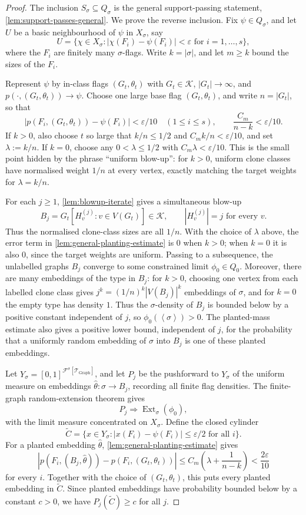 \documentclass[11pt]{article}
\theoremstyle{definition}
\newcommand{\F}{\mathcal{F}}
\newcommand{\K}{\mathcal{K}}
\newcommand{\T}{\mathcal{T}}
\newcommand{\Ext}{\operatorname{Ext}}
\newcommand{\brak}[1]{\left\langle #1\right\rangle}
\newcommand{\eps}{\varepsilon}
\begin{document}
\begin{proof}
The inclusion $S_\sigma\subseteq Q_\sigma$ is the general support-passing statement,
\cref{lem:support-passes-general}.  We prove the reverse inclusion.  Fix
$\psi\in Q_\sigma$, and let $U$ be a basic neighbourhood of $\psi$ in $X_\sigma$, say
\[
  U=\{\chi\in X_\sigma:
      |\chi(F_i)-\psi(F_i)|<\eps\text{ for }i=1,\ldots,s\},
\]
where the $F_i$ are finitely many $\sigma$-flags.  Write $k=|\sigma|$, and let
$m\ge k$ bound the sizes of the $F_i$.

Represent $\psi$ by in-class flags $(G_t,\theta_t)$ with $G_t\in\K$,
$|G_t|\to\infty$, and $p(\cdot,(G_t,\theta_t))\to\psi$.  Choose one large base flag
$(G_t,\theta_t)$, and write $n=|G_t|$, so that
\[
  |p(F_i,(G_t,\theta_t))-\psi(F_i)|<\eps/10
  \quad(1\le i\le s),
  \qquad
  \frac{C_m}{n-k}<\eps/10.
\]
If $k>0$, also choose $t$ so large that $k/n\le1/2$ and $C_m k/n<\eps/10$, and set
$\lambda:=k/n$.  If $k=0$, choose any $0<\lambda\le1/2$ with
$C_m\lambda<\eps/10$.  This is the small point hidden by the phrase ``uniform blow-up'':
for $k>0$, uniform clone classes have normalised weight $1/n$ at every vertex, exactly
matching the target weights for $\lambda=k/n$.

For each $j\ge1$, \cref{lem:blowup-iterate} gives a simultaneous blow-up
\[
  B_j=G_t[H_v^{(j)}:v\in V(G_t)]\in\K,
  \qquad |H_v^{(j)}|=j\text{ for every }v.
\]
Thus the normalised clone-class sizes are all $1/n$.  With the choice of $\lambda$ above,
the error term in \cref{lem:general-planting-estimate} is $0$ when $k>0$; when $k=0$ it is
also $0$, since the target weights are uniform.  Passing to a subsequence, the unlabelled
graphs $B_j$ converge to some constrained limit $\phi_0\in Q_0$.  Moreover, there are
many embeddings of the type in $B_j$: for $k>0$, choosing one vertex from each labelled
clone class gives $j^k=(1/n)^k|V(B_j)|^k$ embeddings of $\sigma$, and for $k=0$ the
empty type has density $1$.  Thus the $\sigma$-density of $B_j$ is
bounded below by a positive constant independent of $j$, so
$\phi_0(\brak\sigma)>0$.  The planted-mass estimate also gives a positive lower bound,
independent of $j$, for the probability that a uniformly random embedding of
$\sigma$ into $B_j$ is one of these planted embeddings.

Let $Y_\sigma=[0,1]^{\F^\sigma[\T_{\mathrm{Graph}}]}$, and let $P_j$ be the pushforward
to $Y_\sigma$ of the uniform measure on embeddings
$\widehat\theta:\sigma\to B_j$, recording all finite flag densities.  The finite-graph
random-extension theorem gives
\[
  P_j\Rightarrow \Ext_\sigma(\phi_0),
\]
with the limit measure concentrated on $X_\sigma$.  Define the closed cylinder
\[
  \widetilde C=
  \{x\in Y_\sigma:
    |x(F_i)-\psi(F_i)|\le\eps/2\text{ for all }i\}.
\]
For a planted embedding $\widehat\theta$, \cref{lem:general-planting-estimate} gives
\[
  |p(F_i,(B_j,\widehat\theta))-p(F_i,(G_t,\theta_t))|
  \le C_m\left(\lambda+\frac1{n-k}\right)<\frac{2\eps}{10}
\]
for every $i$.  Together with the choice of $(G_t,\theta_t)$, this puts every planted
embedding in $\widetilde C$.  Since planted embeddings have probability bounded below by a
constant $c>0$, we have $P_j(\widetilde C)\ge c$ for all $j$.


\end{proof}
\end{document}

